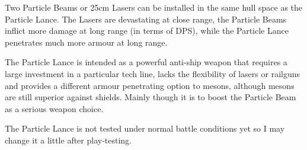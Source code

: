 \documentclass[../Aurora C# unofficial manual.tex]{subfiles}
\begin{document}
	Two Particle Beams or 25cm Lasers can be installed in the same hull space as the Particle Lance. The Lasers are devastating at close range, the Particle Beams inflict more damage at long range (in terms of DPS), while the Particle Lance penetrates much more armour at long range.
	
	The Particle Lance is intended as a powerful anti-ship weapon that requires a large investment in a particular tech line, lacks the flexibility of lasers or railguns and provides a different armour penetrating option to mesons, although mesons are still superior against shields. Mainly though it is to boost the Particle Beam as a serious weapon choice.
	
	The Particle Lance is not tested under normal battle conditions yet so I may change it a little after play-testing.
\end{document}
